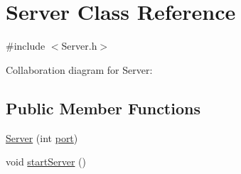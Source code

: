 \hypertarget{classServer}{}\section{Server Class Reference}
\label{classServer}


{\ttfamily \#include $<$Server.\+h$>$}



Collaboration diagram for Server\+:
\subsection*{Public Member Functions}
\begin{DoxyCompactItemize}
\item 
\mbox{\hyperlink{classServer_a7d1fe6ba5f0fe9190a4f039662ea0e85}{Server}} (int \mbox{\hyperlink{classServer_a926c9dae229a62b6d33fdbb41dca6d82}{port}})
\item 
void \mbox{\hyperlink{classServer_af59bb3a96b3311ed2b87e2d6899d9f79}{start\+Server}} ()
\end{DoxyCompactItemize}
